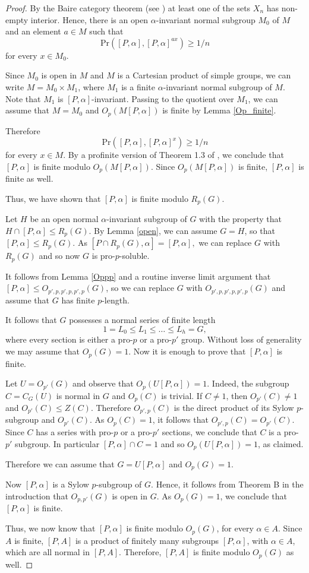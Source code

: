 \documentclass[12pt]{amsart}
\newcommand{\al }{\alpha }
\newcommand{\pr }{\mathrm{Pr} }
\begin{document}
\begin{proof}
By the Baire category theorem (see \cite[p. 200]{Ke}) at least one of the sets $X_n$ has  non-empty interior. Hence, there is an open $\al$-invariant 
 normal subgroup $M_0$ of $M$ and an element $a\in M$ such that 
 \[ \pr([P,\alpha], [P,\alpha]^{ax})\ge 1/n\]
  for every $x \in M_0$. 

Since $M_0$ is open in $M$ and $M$ is a Cartesian product of simple groups, we can write $M=M_0 \times M_1$, where $M_1$ is a finite $\al$-invariant  normal subgroup of $M$. Note that $M_1$ is $[P,\alpha]$-invariant. 
 Passing to the quotient over $M_1$, we can assume that $M=M_0$  and $O_p(M[P,\alpha])$ is finite  by Lemma \ref{Op_finite}.  

Therefore  
\[ \pr([P,\alpha], [P,\alpha]^{x})\ge 1/n \]
 for every $x \in M$.
 By a profinite version of Theorem 1.3 of \cite{DGMS2}, we conclude that $[P,\al]$ is finite modulo $O_p(M [P,\al])$. Since $O_p(M[P,\alpha])$ is finite, $[P,\al]$ is finite as well.  
  
Thus, we have shown that $[P,\al]$ is finite modulo $R_p(G)$. 
  
Let $H$ be an open normal $\alpha$-invariant subgroup of $G$ with the property that $H \cap [P,\al] \le R_p(G)$. By Lemma \ref{open}, we can assume $G=H$, so that $[P, \al ] \le  R_p(G)$. 
 As  $[P\cap R_p(G),\alpha]= [P,\alpha],$   we can replace $G$ with $R_p(G)$  and so now $G$ is  pro-$p$-soluble. 
  


It follows from Lemma \ref{Oppp} and a routine inverse limit argument that $[P,\alpha]\le O_{p',p,p',p,p',p}(G)$, so we can replace $G$ with $O_{p',p,p',p,p',p}(G)$ and assume that $G$ has finite $p$-length.

  It follows that $G$ possesses a normal series of finite length
  \[1 = L_0 \le L_1 \le\dots \le L_h=G,\]
 where every section is either a pro-$p$ or a pro-$p'$ group. Without loss of generality we may assume that $O_p(G)=1$. Now it is enough to prove that $[P,\al]$ is finite.

Let $U=O_{p'}(G)$ and observe that  $O_p(U [P,\al])=1$. 
Indeed, the subgroup $C=C_G(U)$ is normal in $G$ and $O_p(C)$ is trivial. If $C\ne1$, then $O_{p'}(C)\ne1$ and $O_{p'}(C)\leq Z(C)$. Therefore $O_{p',p}(C)$ is the direct product of its Sylow $p$-subgroup and  $O_{p'}(C)$. As $O_p(C)=1$, it follows that $O_{p',p}(C)=O_{p'}(C)$.  Since $C$ has a series with  pro-$p$ or a pro-$p'$ sections, we conclude that $C$ is a pro-$p'$ subgroup. In particular $[P,\al] \cap C=1$ and so $O_p(U [P,\al])=1$,  as claimed. 

Therefore we can assume that $G=U[P,\al]$ and $O_p(G)=1$. 

Now $[P,\al]$ is a Sylow $p$-subgroup of $G$. Hence, it follows from Theorem B in the introduction that $O_{p,p'}(G)$ is open in $G$. As $O_p(G)=1$,  we conclude that $[P,\al]$ is finite. 

Thus, we now know that $[P,\al]$ is finite modulo $O_p(G)$, for every $\al \in A$. 
 Since $A$ is finite, $[P,A]$ is a product of finitely many  subgroups $[P,\al]$, with $\al \in A$, which are all normal in $[P,A]$. Therefore, $[P,A]$ is finite modulo $O_p(G)$ as well. 
 \end{proof}
\end{document}
